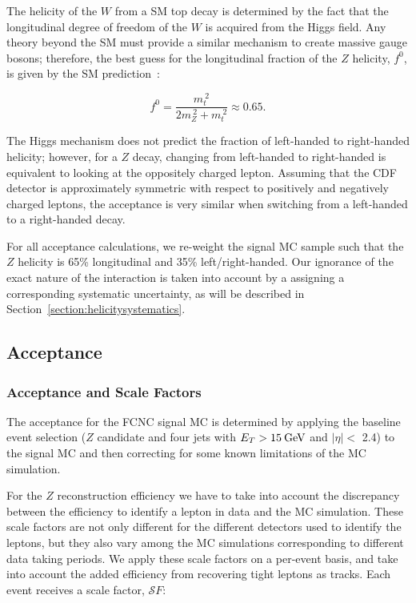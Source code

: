 The helicity of the $W$ from a SM top decay is determined by the fact
that the longitudinal degree of freedom of the $W$ is acquired from the
Higgs field. Any theory beyond the SM must provide a similar mechanism
to create massive gauge bosons; therefore, the best guess for the longitudinal
fraction of the $Z$ helicity, $f^0$, is given by the SM prediction~\cite{Tait}:

\begin{equation}
f^0 = \frac{m_t^{~2}}{2m_Z^{~2} + m_t^{~2}} \approx 0.65.
\end{equation}

The Higgs mechanism does not predict the fraction of left-handed to
right-handed helicity; however, for a $Z$ decay, changing from
left-handed to right-handed is equivalent to looking at the oppositely
charged lepton.  Assuming that the CDF detector is approximately
symmetric with respect to positively and negatively charged leptons,
the acceptance is very similar when switching from a
left-handed to a right-handed decay.

For all acceptance calculations, we re-weight the signal MC sample such
that the $Z$ helicity is 65\% longitudinal and 35\% left/right-handed. Our
ignorance of the exact nature of the interaction is taken into account
by a assigning a corresponding systematic uncertainty, as will be
described in Section~\ref{section:helicitysystematics}.


\subsection{Acceptance}

\subsubsection{Acceptance and Scale Factors}
The acceptance for the FCNC signal MC is determined by applying the
baseline event selection ($Z$ candidate and four jets with $E_{T}>15
\:\mathrm{GeV}$ and $|\eta| <$ 2.4) to the signal MC and then correcting for some known limitations of
the MC simulation. 

For the $Z$ reconstruction efficiency we have to
take into account the discrepancy between the efficiency to identify a
lepton in data and the MC simulation. These scale factors are not only different for the
different detectors used to identify the leptons, but they also vary among the MC
simulations corresponding to different data taking periods. We apply these scale 
factors on a per-event basis, and take into account the added efficiency from
recovering tight leptons as tracks. Each event receives a scale factor, ${\mathcal SF}$:

